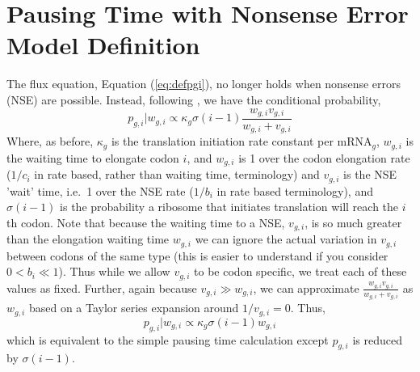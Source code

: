 \documentclass{article}
\newcommand{\waitTerm}{\ensuremath{w}\xspace}
\newcommand{\wgi}{\ensuremath{\waitTerm_{g,i}}\xspace}
\newcommand{\alphac}{\ensuremath{{\alpha_c}}\xspace}
\newcommand{\lambdacprime}{\ensuremath{{\lambda_c^\prime}}\xspace}
\newcommand{\nseTerm}{\ensuremath{v}\xspace}
\newcommand{\vgi}{\ensuremath{\nseTerm_{g,i}}\xspace}
\newcommand{\pgi}{\ensuremath{{p_{g,i}}}\xspace}
\newcommand{\ngc}{\ensuremath{{n_{g}^c}}\xspace}
\newcommand{\kappag}{\ensuremath{{\kappa_{g}}}\xspace}
\newcommand{\mRNAg}{mRNA$_g$\xspace}
\newcommand{\Ygc}{\ensuremath{{Y_{g}^c}}\xspace}
\begin{document}


\section*{Pausing Time with Nonsense Error Model Definition}
The flux equation, Equation (\ref{eq:defpgi}), no longer holds when nonsense errors (NSE) are possible.
Instead, following \citet{GilchristAndWagner2006}, we have the conditional probability,
\begin{equation}
\label{eq:defpgiNse}
\pgi|\wgi \propto \kappag \sigma(i-1) \frac{\wgi \vgi}{\wgi + \vgi}
\end{equation} 
Where, as before, \kappag is the translation initiation rate constant per \mRNAg, \wgi is the waiting time to elongate codon $i$, and  \wgi is 1 over the codon elongation rate ($1/c_i$ in rate based, rather than waiting time, terminology) and \vgi is the NSE 'wait' time, i.e.~1 over the NSE rate ($1/b_i$ in rate based terminology), and $\sigma(i-1)$ is the probability a ribosome that initiates translation will reach the $i$th codon.
Note that because the waiting time to a NSE, \vgi, is so much greater than the elongation waiting time \wgi we can ignore the actual variation in \vgi between codons of the same type (this is easier to understand if you consider $0 < b_i \ll 1$).
Thus while we allow \vgi to be codon specific, we treat each of these values as fixed.
Further, again because $\vgi \gg \wgi$, we can approximate $\frac{\wgi \vgi}{\wgi + \vgi}$ as $\wgi$ based on a Taylor series expansion around $1/\vgi = 0 $.
Thus,
\begin{equation}
\label{eq:defpgiNseApprox}
\pgi|\wgi \propto \kappag \sigma(i-1) \wgi
\end{equation} 
which is equivalent to the simple pausing time calculation except $\pgi$ is reduced by $\sigma(i-1)$.
\end{document}
